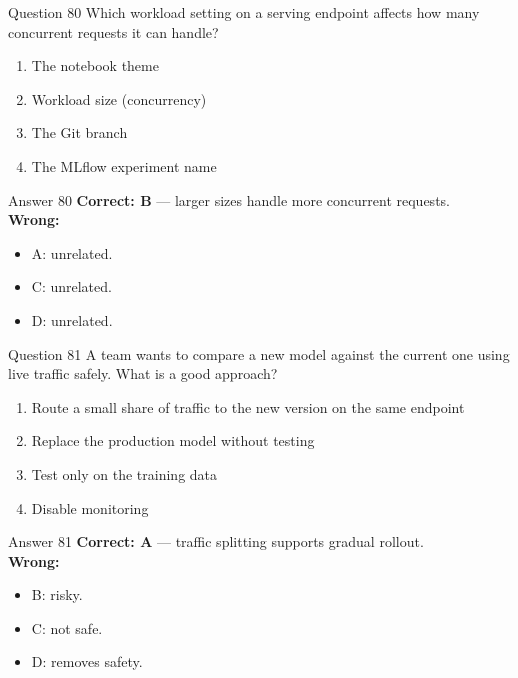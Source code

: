 \documentclass[aspectratio=169,11pt]{beamer}
\begin{document}
\begin{frame}{Question 80}
Which workload setting on a serving endpoint affects how many concurrent requests it can handle?
\begin{enumerate}[label=\Alph*.]
\item The notebook theme
\item Workload size (concurrency)
\item The Git branch
\item The MLflow experiment name
\end{enumerate}
\end{frame}
\begin{frame}{Answer 80}
\textbf{Correct: B} --- larger sizes handle more concurrent requests.\\
\vspace{0.5em}
\textbf{Wrong:}
\begin{itemize}
\item A: unrelated.
\item C: unrelated.
\item D: unrelated.
\end{itemize}
\end{frame}

\begin{frame}{Question 81}
A team wants to compare a new model against the current one using live traffic safely. What is a good approach?
\begin{enumerate}[label=\Alph*.]
\item Route a small share of traffic to the new version on the same endpoint
\item Replace the production model without testing
\item Test only on the training data
\item Disable monitoring
\end{enumerate}
\end{frame}
\begin{frame}{Answer 81}
\textbf{Correct: A} --- traffic splitting supports gradual rollout.\\
\vspace{0.5em}
\textbf{Wrong:}
\begin{itemize}
\item B: risky.
\item C: not safe.
\item D: removes safety.
\end{itemize}
\end{frame}
\end{document}

